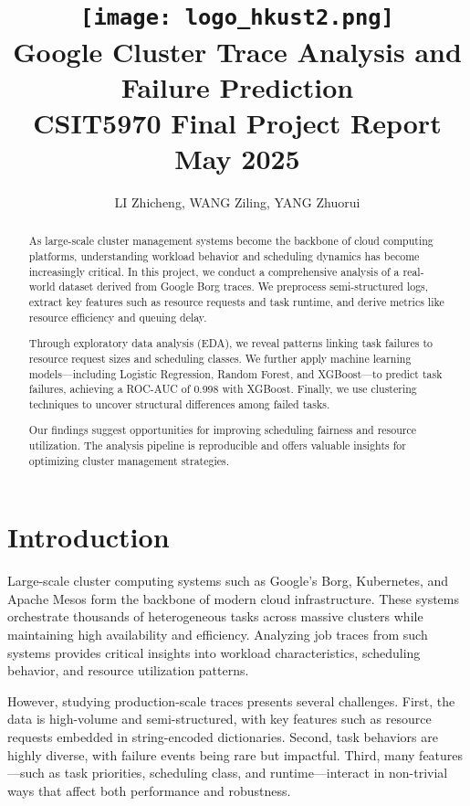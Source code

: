 \documentclass[a4paper,12pt]{article}
\title{
    \vspace{2cm}
    \texttt{[image: logo\_hkust2.png]} \\
    \vspace{1cm}
    \textbf{\Huge Google Cluster Trace Analysis and Failure Prediction} \\
    \vspace{0.5cm}
    \large CSIT5970 Final Project Report \\
    \vspace{0.3cm}
    \large May 2025
}
\author{LI Zhicheng, WANG Ziling, YANG Zhuorui}
\date{}
\begin{document}
\maketitle
\thispagestyle{empty}
\newpage

\setcounter{page}{1}  %
\tableofcontents
\newpage

\begin{abstract}
As large-scale cluster management systems become the backbone of cloud computing platforms, understanding workload behavior and scheduling dynamics has become increasingly critical. In this project, we conduct a comprehensive analysis of a real-world dataset derived from Google Borg traces. We preprocess semi-structured logs, extract key features such as resource requests and task runtime, and derive metrics like resource efficiency and queuing delay.

Through exploratory data analysis (EDA), we reveal patterns linking task failures to resource request sizes and scheduling classes. We further apply machine learning models---including Logistic Regression, Random Forest, and XGBoost---to predict task failures, achieving a ROC-AUC of 0.998 with XGBoost. Finally, we use clustering techniques to uncover structural differences among failed tasks.

Our findings suggest opportunities for improving scheduling fairness and resource utilization. The analysis pipeline is reproducible and offers valuable insights for optimizing cluster management strategies.
\end{abstract}

\section{Introduction}

Large-scale cluster computing systems such as Google's Borg, Kubernetes, and Apache Mesos form the backbone of modern cloud infrastructure. These systems orchestrate thousands of heterogeneous tasks across massive clusters while maintaining high availability and efficiency. Analyzing job traces from such systems provides critical insights into workload characteristics, scheduling behavior, and resource utilization patterns.

However, studying production-scale traces presents several challenges. First, the data is high-volume and semi-structured, with key features such as resource requests embedded in string-encoded dictionaries. Second, task behaviors are highly diverse, with failure events being rare but impactful. Third, many features—such as task priorities, scheduling class, and runtime—interact in non-trivial ways that affect both performance and robustness.
\end{document}
